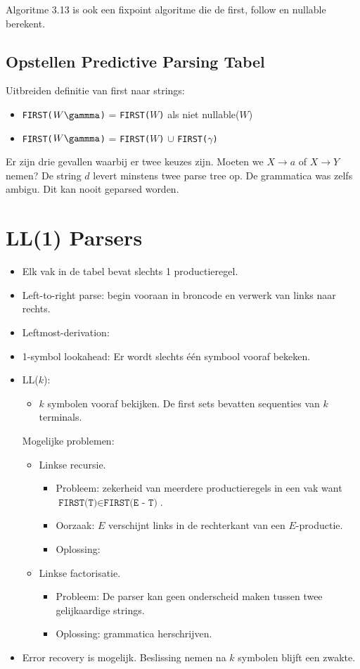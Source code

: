 Algoritme 3.13 is ook een fixpoint algoritme die de first, follow en nullable berekent.

\subsection{Opstellen Predictive Parsing Tabel}
Uitbreiden definitie van first naar strings:
\begin{itemize}
	\item \texttt{FIRST($W\gammma$)} = \texttt{FIRST($W$)} als niet nullable($W$)
	\item \texttt{FIRST($W\gammma$)} = \texttt{FIRST($W$)} $\cup$ \texttt{FIRST($\gamma$)} 
\end{itemize}


Er zijn drie gevallen waarbij er twee keuzes zijn. Moeten we $X \rightarrow a$ of $X \rightarrow Y$ nemen? De string $d$ levert minstens twee parse tree op. De grammatica was zelfs ambigu. Dit kan nooit geparsed worden.

\section{LL(1) Parsers}
\begin{itemize}
	\item Elk vak in de tabel bevat slechts 1 productieregel.
	\item Left-to-right parse: begin vooraan in broncode en verwerk van links naar rechts. 
	\item Leftmost-derivation: 
	\item 1-symbol lookahead: Er wordt slechts één symbool vooraf bekeken.
	\item LL($k$):
	\begin{itemize}
		\item $k$ symbolen vooraf bekijken. De first sets bevatten sequenties van $k$ terminals.
	\end{itemize}
	\alert Mogelijke problemen:
	\begin{itemize}
		\item Linkse recursie.
		\begin{itemize}
			\item Probleem: zekerheid van meerdere productieregels in een vak want $\texttt{FIRST(T)} \in \texttt{FIRST(E - T)}$. 
			\item Oorzaak: $E$ verschijnt links in de rechterkant van een $E$-productie.
			\item Oplossing: 
		\end{itemize} 
		\item Linkse factorisatie.
		\begin{itemize}
			\item Probleem: De parser kan geen onderscheid maken tussen twee gelijkaardige strings.
			\item Oplossing: grammatica herschrijven.
		\end{itemize}
	\end{itemize}
	\item Error recovery is mogelijk.
	\alert Beslissing nemen na $k$ symbolen blijft een zwakte.
	
\end{itemize}

